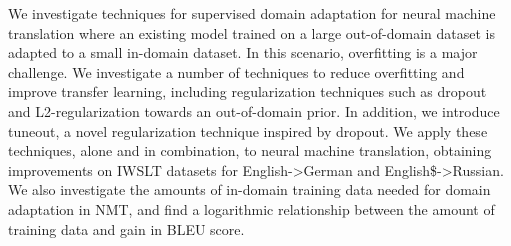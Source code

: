We investigate techniques for supervised domain adaptation for neural machine translation where an existing model trained on a large out-of-domain dataset is adapted to a small in-domain dataset. In this scenario, overfitting is a major challenge. We investigate a number of techniques to reduce overfitting and improve transfer learning, including regularization techniques such as dropout and L2-regularization towards an out-of-domain prior. In addition, we introduce tuneout, a novel regularization technique inspired by dropout. We apply these techniques, alone and in combination, to neural machine translation, obtaining improvements on IWSLT datasets for English->German and English\$->Russian. We also investigate the amounts of in-domain training data needed for domain adaptation in NMT, and find a logarithmic relationship between the amount of training data and gain in BLEU score.
